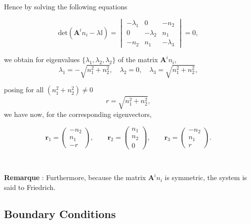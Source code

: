 \documentclass[a4paper,oneside,10pt]{report}
\begin{document}
Hence by solving the following equations

\begin{equation}
\mbox{det} (\mathbf{A}^i n_i - \lambda\mathbb{I}) =
\begin{vmatrix}
-\lambda_1 & 0 & -n_2\\
0 & -\lambda_2 & n_1\\
-n_2 & n_1 & -\lambda_3
\end{vmatrix}
=0,
\end{equation}

we obtain for eigenvalues $\{\lambda_1,\lambda_2,\lambda_2\}$ of the matrix $\mathbf{A}^i n_i$, 
\begin{equation}
\label{eq:vp}
\lambda_1 = -\sqrt{n_1^2 + n_2^2},\quad \lambda_2 =0,\quad \lambda_3 = \sqrt{n_1^2 + n_2^2},
\end{equation}

posing for all $(n_1^2 + n_2^2) \neq 0 $ 
$$r=\sqrt{n_1^2 + n_2^2},$$
we have now, for the corresponding eigenvectors,

\begin{equation}
\mathbf{r}_{1}=
\begin{pmatrix}
-n_2\\
n_1\\
-r
\end{pmatrix},
\qquad
\mathbf{r}_2=
\begin{pmatrix}
n_1\\
n_2\\
0
\end{pmatrix},
\qquad
\mathbf{r}_{3}=
\begin{pmatrix}
-n_2\\
n_1\\
r
\end{pmatrix}.
\end{equation}
\begin{center}
\\
\end{center}
\textbf{Remarque} : Furthermore, because the matrix $\mathbf{A}^in_i $ is symmetric, the system is said to Friedrich.\\


\subsection{Boundary Conditions}

\end{document}

